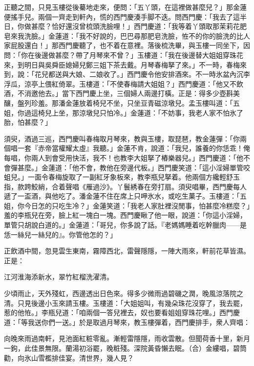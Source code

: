 正聽之間，只見玉樓從後驀地走來，便問：「五丫頭，在這裡做甚麼兒？」那金蓮便搖手兒。{}兩個一齊走到軒內，慌的西門慶湊手脚不迭。問西門慶：「我去了這半日，你做甚麼？恰好還沒曾梳頭洗臉哩！」西門慶道：「我等着丫頭取那茉莉花肥皂來我洗臉。」金蓮道：「我不好說的，巴巴尋那肥皂洗臉，恠不的你的臉洗的比人家屁股還白！」{}那西門慶聽了，也不着在意裡。落後梳洗畢，與玉樓一同坐下，因問：「你在後邊做甚麼？帶了月琴來不曾？」玉樓道：「我在後邊替大姐姐穿珠花來，到明日與吳舜臣媳婦兒鄭三姐下茶去戴。月琴春梅拏了來。」不一時，春梅來到，說：「花兒都送與大娘、二娘收了。」西門慶令他安排酒來。不一時氷盆內沉李浮瓜，涼亭上偎紅倚翠。玉樓道：「不使春梅請大姐姐？」西門慶道：「他又不飲酒，不消邀他去。」當下西門慶上坐，三個婦人兩邊打橫。正是：得多少壺斟美釀，盤列珍羞。那潘金蓮放着椅兒不坐，只坐豆青磁涼墩兒。孟玉樓叫道：「五姐，你過這椅兒上坐，那涼墩兒只怕冷。」金蓮道：「不妨事，我老人家不怕氷了胎，怕甚麼？」{}

須臾，酒過三巡，西門慶叫春梅取月琴來，教與玉樓，取琵琶，教金蓮彈：「你兩個唱一套『赤帝當權耀太虛』我聽。」金蓮不肯，說道：「我兒，誰養的你恁乖！俺每唱，你兩人到會受用快活，我不！也教李大姐拏了樁樂器兒。」{}西門慶道：「他不會彈甚麼。」金蓮道：「他不會，教他在旁邊代板。」西門慶笑道：「這小淫婦單管咬蛆兒。」一面令春梅旋取了一副紅牙象板來，教李瓶兒拏着。他兩個方纔輕舒玉指，款跨鮫綃，合着聲唱《雁過沙》。丫鬟綉春在旁打扇。須臾唱畢，西門慶每人遞了一盃酒，與他吃了。潘金蓮不住在席上只呷氷水，或吃生菓子。玉樓道：「五姐，你今日怎的只吃生冷？」金蓮笑道：「我老人家肚裡沒閒事，怕甚麼冷糕麼？」{}羞的李瓶兒在旁，臉上紅一塊白一塊。西門慶瞅了他一眼，說道：「你這小淫婦，單管只胡說白道的。」金蓮道：「哥兒，你多說了話。『老媽媽睡着吃幹臘肉——是恁一絲兒一絲兒的』。你管他怎的？」

正飲酒中間，忽見雲生東南，霧障西北，雷聲隱隱，一陣大雨來，軒前花草皆濕。正是：

\begin{myquote} 
江河淮海添新水，翠竹紅榴洗濯清。
\end{myquote} 

少頃雨止，天外殘虹，西邊透出日色來。得多少微雨過碧磯之潤，晚風涼落院之清。只見後邊小玉來請玉樓。玉樓道：「大姐姐叫，有幾朵珠花沒穿了，我去罷，惹的他恠。」李瓶兒道：「咱兩個一答兒裡去，奴也要看姐姐穿珠花哩。」西門慶道：「等我送你們一送。」於是取過月琴來，教玉樓彈着，西門慶排手，衆人齊唱：

\begin{myquote} 
{}向晚來雨過南軒，見池面紅粧零亂。漸輕雷隱隱，雨收雲散。但聞荷香十里，新月一鉤，此佳景無限。蘭湯初浴罷，晚粧殘。深院黃昏懶去眠。{\markfont\small{（合）}}金縷唱，碧筒勸，向氷山雪檻排佳宴。清世界，幾人見？
\end{myquote} 

